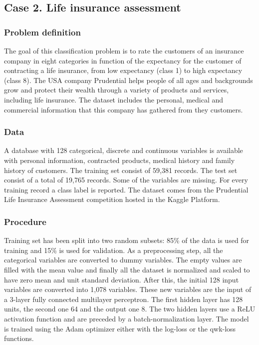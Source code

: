 \subsection{Case 2. Life insurance assessment}

\subsubsection{Problem definition}

The goal of this classification problem is to rate the customers of an insurance company in eight categories in function of the expectancy for the customer of contracting a life insurance, from low expectancy (class 1) to high expectancy (class 8). The USA company Prudential helps people of all ages and backgrounds grow and protect their wealth through a variety of products and services, including life insurance. The dataset includes the personal, medical and commercial information that this company has gathered from they customers. 

\subsubsection{Data}

A database with 128 categorical, discrete and continuous variables is available with personal information, contracted products, medical history and family history of customers. The training set consist of 59,381 records. The test set consist of a total of 19,765 records. Some of the variables are missing. For every training record a class label is reported. The dataset comes from the Prudential Life Insurance Assessment competition hosted in the Kaggle Platform.

\subsubsection{Procedure}

Training set has been split into two random subsets: 85\% of the data is used for training and 15\% is used for validation. As a preprocessing step, all the categorical variables are converted to dummy variables. The empty values are filled with the mean value and finally all the dataset is normalized and scaled to have zero mean and unit standard deviation. After this, the initial 128 input variables are converted into 1,078 variables. These new variables are the input of a 3-layer fully connected multilayer perceptron. The first hidden layer has 128 units, the second one 64 and the output one 8. The two hidden layers use a ReLU activation function and are preceded by a batch-normalization layer. The model is trained using the Adam optimizer either with the log-loss or the qwk-loss functions.


